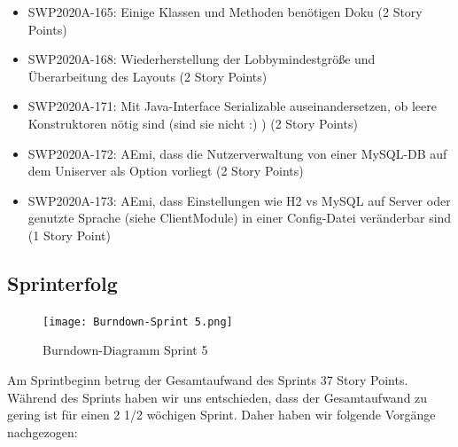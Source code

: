 \documentclass[12pt,a4paper, oneside]{article}
\begin{document}
\begin{itemize}
        \item SWP2020A-165: Einige Klassen und Methoden benötigen Doku (2 Story Points)

        \item SWP2020A-168: Wiederherstellung der Lobbymindestgröße und Überarbeitung des Layouts (2 Story Points)

        \item SWP2020A-171: Mit Java-Interface Serializable auseinandersetzen, ob leere Konstruktoren nötig sind (sind sie nicht :) )    (2 Story Points)

        \item SWP2020A-172: AEmi, dass die Nutzerverwaltung von einer MySQL-DB auf dem Uniserver als Option vorliegt (2 Story Points)

        \item SWP2020A-173: AEmi, dass Einstellungen wie H2 vs MySQL auf Server oder genutzte Sprache (siehe ClientModule) in einer Config-Datei veränderbar sind (1 Story Point)

    \end{itemize}

    \subsection{Sprinterfolg}

    \begin{figure}[h]
        \centering
        \texttt{[image: Burndown-Sprint 5.png]}
        \caption{Burndown-Diagramm Sprint 5}
        \label{fig: Burndown-Sprint5}
    \end{figure}

    \noindent
    Am Sprintbeginn betrug der Gesamtaufwand des Sprints 37 Story Points. Während des Sprints haben wir uns entschieden, dass der Gesamtaufwand zu gering ist für einen 2 1/2 wöchigen Sprint. Daher haben wir folgende Vorgänge nachgezogen:
\end{document}
